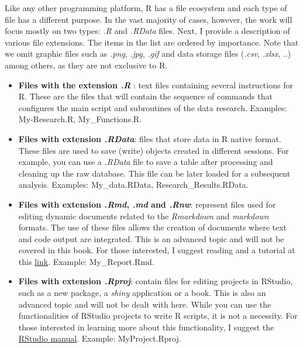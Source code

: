 \documentclass[11pt,]{book}
\begin{document}
Like any other programming platform, R has a file ecosystem and each
type of file has a different purpose. In the vast majority of cases,
however, the work will focus mostly on two types: \emph{.R} and
\emph{.RData} files. Next, I provide a description of various file
extensions. The items in the list are ordered by importance. Note that
we omit graphic files such as \emph{.png}, \emph{.jpg}, \emph{.gif} and
data storage files (\emph{.csv}, \emph{.xlsx}, ..) among others, as they
are not exclusive to R.  

\begin{itemize}
\item
  \textbf{Files with the extension \emph{.R }}: text files containing
  several instructions for R. These are the files that will contain the
  sequence of commands that configures the main script and subroutines
  of the data research. Examples: My-Research.R, My\_Functions.R.
\item
  \textbf{Files with extension \emph{.RData}}: files that store data in
  R native format. These files are used to save (write) objects created
  in different sessions. For example, you can use a \emph{.RData} file
  to save a table after processing and cleaning up the raw database.
  This file can be later loaded for a subsequent analysis. Examples:
  My\_data.RData, Research\_Results.RData.
\item
  \textbf{Files with extension \emph{.Rmd}, \emph{.md} and \emph{.Rnw}}:
  represent files used for editing dynamic documents related to the
  \emph{Rmarkdown} and \emph{markdown} formats. The use of these files
  allows the creation of documents where text and code output are
  integrated. This is an advanced topic and will not be covered in this
  book. For those interested, I suggest reading \citet{baumer2014r} and
  a tutorial at this
  \href{http://rmarkdown.rstudio.com/index.html}{link}. Example:
  My\_Report.Rmd.  
\item
  \textbf{Files with extension \emph{.Rproj}}: contain files for editing
  projects in RStudio, such as a new package, a \emph{shiny} application
  or a book. This is also an advanced topic and will not be dealt with
  here. While you can use the functionalities of RStudio projects to
  write R scripts, it is not a necessity. For those interested in
  learning more about this functionality, I suggest the
  \href{https://support.rstudio.com/hc/en-us/articles/200526207-Using-Projects}{RStudio
  manual}. Example: MyProject.Rproj. 
\end{itemize}
\end{document}
